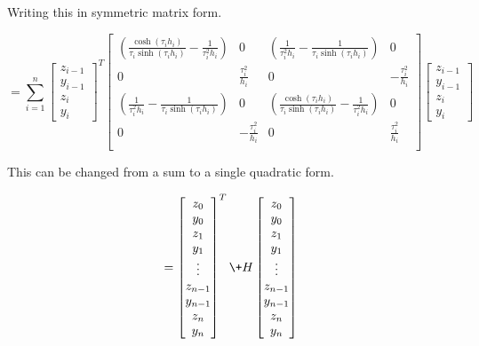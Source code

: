 \documentclass{article}
\begin{document}
Writing this in symmetric matrix form.

\begin{equation}
    = \sum_{i=1}^{n} \begin{bmatrix}
        z_{i-1} \\ y_{i-1} \\ z_i \\ y_i
    \end{bmatrix}^T
    \begin{bmatrix}
        \left(\frac{\cosh(\tau_i h_i)}{\tau_i \sinh(\tau_i h_i)} - \frac{1}{\tau_i^2 h_i} \right) & 0 & \left( \frac{1}{\tau_i^2 h_i} - \frac{1}{\tau_i \sinh(\tau_i h_i)} \right) & 0 \\
        0 & \frac{\tau_i^2}{h_i} & 0 & -\frac{\tau_i^2}{h_i} \\
        \left(\frac{1}{\tau_i^2 h_i} - \frac{1}{\tau_i \sinh(\tau_i h_i)}\right) & 0 & \left(\frac{\cosh(\tau_i h_i)}{\tau_i \sinh(\tau_i h_i)} - \frac{1}{\tau_i^2 h_i} \right) & 0 \\
        0 & -\frac{\tau_i^2}{h_i} & 0 & \frac{\tau_i^2}{h_i} \\
    \end{bmatrix}
    \begin{bmatrix}
        z_{i-1} \\ y_{i-1} \\ z_i \\ y_i
    \end{bmatrix}
\end{equation}

This can be changed from a sum to a single quadratic form.

\begin{equation}
    = \begin{bmatrix}
        z_0 \\
        y_0 \\
        z_1 \\
        y_1 \\
        \vdots \\
        z_{n-1} \\
        y_{n-1} \\
        z_n \\
        y_n \\
    \end{bmatrix} ^T
    \+H   
    \begin{bmatrix}
        z_0 \\
        y_0 \\
        z_1 \\
        y_1 \\
        \vdots \\
        z_{n-1} \\
        y_{n-1} \\
        z_n \\
        y_n \\
    \end{bmatrix}
\end{equation}
\end{document}

